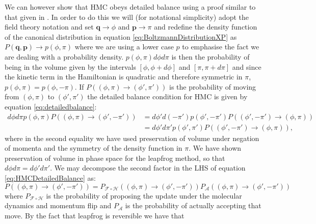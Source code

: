 \documentclass[12pt]{article}
\begin{document}
            We can however show that HMC obeys detailed balance using a proof similar to that given in \cite{duane_kennedy_pendleton_roweth_1987}. In order to do this we will (for notational simplicity) adopt the field theory notation and set $\bm{q}\rightarrow \phi$ and $\bm{p}\rightarrow \pi$ and redefine the density function of the canonical distribution in equation \ref{eq:BoltzmannDistributionXP} as $P\left(\bm{q},\bm{p}\right) \rightarrow p\left(\phi,\pi\right)$ where we are using a lower case $p$ to emphasise the fact we are dealing with a probability density. $p\left(\phi,\pi\right)d\phi d\pi$ is then the probability of being in the volume given by the intervals $\left[\phi,\phi+d\phi\right]$ and  $\left[\pi,\pi+d\pi\right]$ and since the kinetic term in the Hamiltonian is quadratic and therefore symmetric in $\pi$, $p\left(\phi,\pi\right)=p\left(\phi,-\pi\right)$. If $P\left(\left(\phi,\pi\right)\rightarrow\left(\phi',\pi'\right)\right)$ is the probability of moving from $\left(\phi,\pi\right)$ to $\left(\phi',\pi'\right)$ the detailed balance condition for HMC is given by equation \ref{eq:detailedbalance}:
            \begin{align}
                \label{eq:HMCDetailedBalance}
                d\phi d\pi p\left(\phi,\pi\right) P\left(\left(\phi,\pi\right)\rightarrow\left(\phi',-\pi'\right)\right) & = d\phi' d\left(-\pi'\right) p\left(\phi',-\pi'\right) P\left(\left(\phi',-\pi'\right)\rightarrow\left(\phi,\pi\right)\right) \\
                & = d\phi' d\pi' p\left(\phi',\pi'\right) P\left(\left(\phi',-\pi'\right)\rightarrow\left(\phi,\pi\right)\right),
            \end{align}
            where in the second equality we have used preservation of volume under negation of momenta and the symmetry of the density function in $\pi$. We have shown preservation of volume in phase space for the leapfrog method, so that $d\phi d\pi = d\phi' d\pi'$. We may decompose the second factor in the LHS of equation \ref{eq:HMCDetailedBalance} as:
            \begin{equation}
                P\left(\left(\phi,\pi\right) \rightarrow \left(\phi',-\pi'\right)\right) = P_{\mathcal{F}\circ \mathcal{H}}\left(\left(\phi,\pi\right) \rightarrow \left(\phi',-\pi'\right)\right)P_{\mathcal{A}}\left(\left(\phi,\pi\right)\rightarrow \left(\phi',-\pi'\right)\right)
            \end{equation}
            where $P_{\mathcal{F}\circ \mathcal{H}}$ is the probability of proposing the update under the molecular dynamics and momentum flip and $P_\mathcal{A}$ is the probability of actually accepting that move. By the fact that leapfrog is reversible we have that
\end{document}
